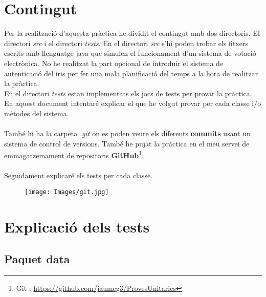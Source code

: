 \documentclass[11pt]{article}
\begin{document}
\section{Contingut}
Per la realització d'aquesta pràctica he dividit el contingut amb dos directoris. El directori \textit{src} i el directori \textit{tests}. En el directori \textit{src} s'hi poden trobar els fitxers escrits amb llenguatge java  que simulen el funcionament d'un sistema de votació electrònica. No he realitzat la part opcional de introduir el sistema de autenticació del iris per fer una mala planificació del temps a la hora de realitzar la pràctica.\\
En el directori \textit{tests} estan implementats els jocs de tests per provar la pràctica. En aquest document intentaré explicar el que he volgut provar per cada classe i/o mètodes del sistema.\\\\
També hi ha la carpeta \textit{.git} on es poden veure els diferents \textbf{commits} usant un sistema de control de versions. També he pujat la pràctica en el meu servei de emmagatzemament de repositoris \textbf{GitHub}\footnote{Git : \url{https://github.com/jaumeg3/ProvesUnitaries}}.\\\\
Seguidament explicaré els tests per cada classe.
\begin{center}
	\begin{figure}[!ht]
		\texttt{[image: Images/git.jpg]}
	\end{figure}
\end{center}
\newpage
\section{Explicació dels tests}
	\subsection{Paquet data}
\end{document}
